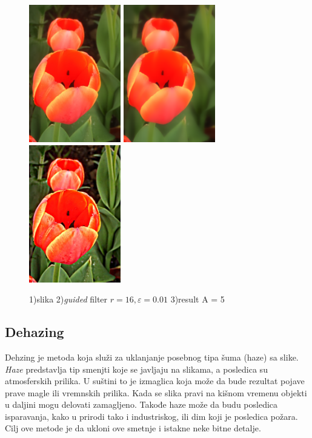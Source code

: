 \documentclass[a4paper,12pt,titlepage]{article}
\begin{document}
\begin{figure}[ht!]
\centering
\includegraphics[width=40mm]{img/flower.png}
\includegraphics[width=40mm]{img/flowerEGF.png}
\includegraphics[width=40mm]{img/flowerER.png}
\caption{1)slika 2)\emph{guided} filter $r = 16, \varepsilon = 0.01$ 3)result A = 5 }
\label{overflow}
\end{figure}

\subsection{Dehazing}%

Dehzing je metoda koja služi za uklanjanje posebnog tipa šuma (haze) sa slike. \emph{Haze} predstavlja tip smenjti koje se javljaju na slikama, a posledica su atmosferskih prilika. U suštini to je izmaglica koja može da bude rezultat pojave prave magle ili vremnskih prilika. Kada se slika pravi na kišnom vremenu objekti u daljini mogu delovati zamagljeno. Takođe haze može da budu posledica isparavanja, kako u prirodi tako i industriskog, ili dim koji je posledica požara. Cilj ove metode je da ukloni ove smetnje i istakne neke bitne detalje.
\end{document}
